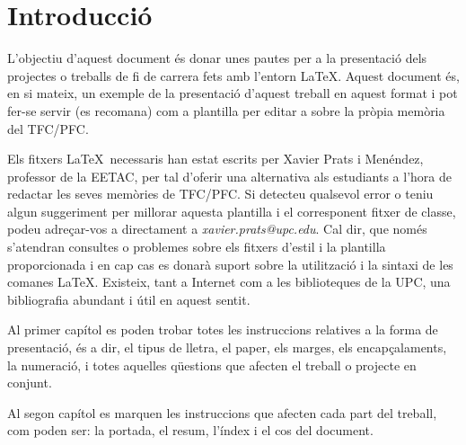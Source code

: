 \cleardoublepage
{}
\chapter*{Introducció}
L'objectiu d'aquest document és donar unes pautes per a la presentació dels projectes o treballs de fi de carrera fets amb l'entorn \LaTeX. Aquest document és, en si mateix, un exemple de la presentació d'aquest treball en aquest format i pot fer-se servir (es recomana) com a plantilla per editar a sobre la pròpia memòria del TFC/PFC.

Els fitxers \LaTeX \ necessaris han estat escrits per Xavier Prats i Menéndez, professor de la EETAC, per tal d'oferir una alternativa als estudiants a l'hora de redactar les seves memòries de TFC/PFC. Si detecteu qualsevol error o teniu algun suggeriment per millorar aquesta plantilla i el corresponent fitxer de classe, podeu adreçar-vos a directament a \emph{xavier.prats@upc.edu}. Cal dir, que només s'atendran consultes o problemes sobre els fitxers d'estil i la plantilla proporcionada i en cap cas es donarà suport sobre la utilització i la sintaxi de les comanes \LaTeX. Existeix, tant a Internet com a les biblioteques de la UPC, una  bibliografia abundant i útil en aquest sentit. 

Al primer capítol es poden trobar totes les instruccions relatives a la forma de presentació, és a dir, el tipus de lletra, el paper, els marges, els encapçalaments, la numeració, i totes aquelles qüestions que afecten el treball o projecte en conjunt.

Al segon capítol es marquen les instruccions que afecten cada part del treball, com poden ser: la portada, el resum, l'índex i el cos del document.
